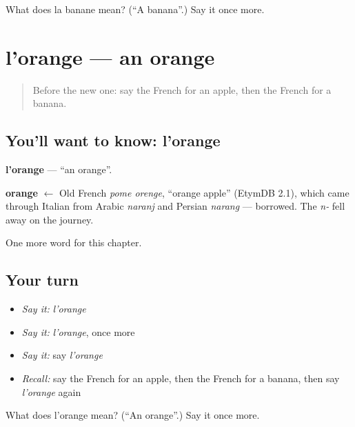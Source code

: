 \begin{tcolorbox}[breakable,colback=teal!4,colframe=teal!35!black,title={Before you move on}]
What does la banane mean? (\textquotedblleft{}A banana\textquotedblright{}.) Say it once more.
\end{tcolorbox}
\section[l'orange]{l'orange — an orange}

\label{lesson:FR-C68-orange}



\begin{quote}
Before the new one: say the French for an apple, then the French for a banana.
\end{quote}

\subsection*{You'll want to know: l'orange}
\textbf{l'orange} — \textquotedblleft{}an orange\textquotedblright{}.

\begin{cousinweb}
\textbf{orange} $\leftarrow$ Old French \emph{pome orenge}, \textquotedblleft{}orange apple\textquotedblright{} (EtymDB 2.1), which came through Italian from Arabic \emph{naranj} and Persian \emph{narang} — borrowed. The \emph{n-} fell away on the journey.
\end{cousinweb}

\begin{grammarlens}[title={What you've built}]
One more word for this chapter.
\end{grammarlens}

\subsection*{Your turn}
\begin{itemize}
\raggedright
  \item \emph{Say it:} \emph{l'orange}
  \item \emph{Say it:} \emph{l'orange}, once more
  \item \emph{Say it:} say \emph{l'orange}
  \item \emph{Recall:} say the French for an apple, then the French for a banana, then say \emph{l'orange} again
\end{itemize}

\begin{tcolorbox}[breakable,colback=teal!4,colframe=teal!35!black,title={Before you move on}]
What does l'orange mean? (\textquotedblleft{}An orange\textquotedblright{}.) Say it once more.
\end{tcolorbox}
